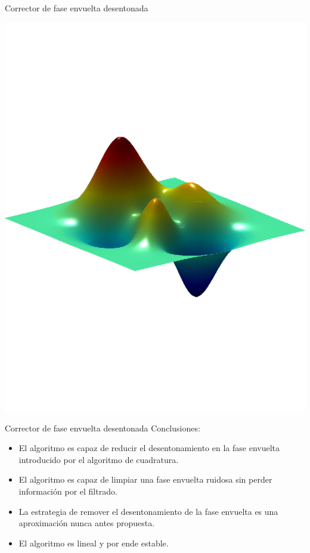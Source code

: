 \documentclass[]{beamer}
\begin{document}
\begin{frame}{Corrector de fase envuelta desentonada}
\begin{center}
\includegraphics[scale=0.27]{Images/Fase_Ideal_3D.pdf}

\end{center}
\end{frame}
\begin{frame}{Corrector de fase envuelta desentonada}
Conclusiones:
\begin{itemize}

\item El algoritmo es capaz de reducir el desentonamiento en la
  fase envuelta introducido por el algoritmo de cuadratura.

\pause \item El algoritmo es capaz de limpiar una fase envuelta
ruidosa sin perder informaci\'on por el filtrado.

\pause \item La estrategia de remover el desentonamiento de la fase
envuelta es una aproximaci\'on nunca antes propuesta.

\pause \item El algoritmo es lineal y por ende estable.

\end{itemize}
\end{frame}
\end{document}
